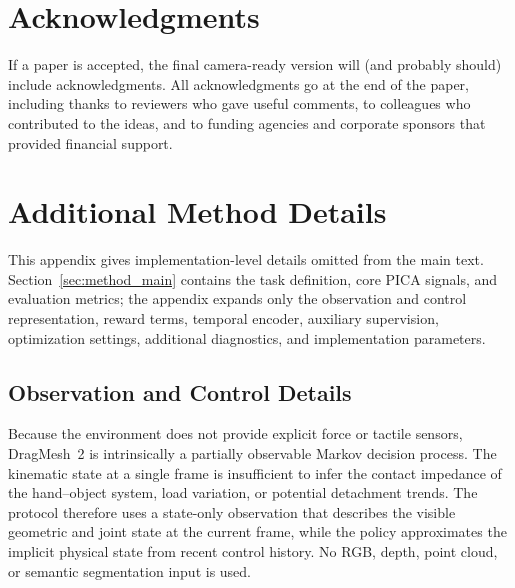 \documentclass{llmxive}
\providecommand{\acknowledgments}{\section*{Acknowledgments}}
\begin{document}
\acknowledgments{If a paper is accepted, the final camera-ready version will (and probably should) include acknowledgments. All acknowledgments go at the end of the paper, including thanks to reviewers who gave useful comments, to colleagues who contributed to the ideas, and to funding agencies and corporate sponsors that provided financial support.}






\appendix

\section{Additional Method Details}
\label{sec:framework}

This appendix gives implementation-level details omitted from the
main text. Section~\ref{sec:method_main} contains the task
definition, core PICA signals, and evaluation metrics; the appendix
expands only the observation and control representation, reward
terms, temporal encoder, auxiliary supervision, optimization
settings, additional diagnostics, and implementation parameters.

\subsection{Observation and Control Details}
\label{sec:obs}

Because the environment does not provide explicit force or tactile
sensors, DragMesh~2 is intrinsically a partially observable Markov
decision process. The kinematic state at a single frame is
insufficient to infer the contact impedance of the hand--object
system, load variation, or potential detachment trends. The protocol
therefore uses a state-only observation that describes the visible
geometric and joint state at the current frame, while the policy
approximates the implicit physical state from recent control
history. No RGB, depth, point cloud, or semantic segmentation input
is used.
\end{document}
